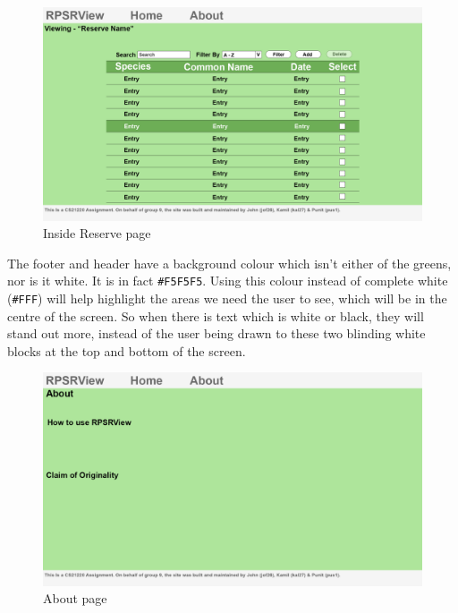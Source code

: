 \documentclass[12pt]{article}
\begin{document}
		\begin{figure}[H]
			\begin{center}
				\includegraphics[scale=0.20]{web-InsideReservePLAN}
			\end{center}
			\caption{Inside Reserve page}
			\label{fig:ireserve-page}
		\end{figure}

		\noindent The footer and header have a background colour which isn’t either of the greens, nor is it white. It is in fact \texttt{\#F5F5F5}. Using this colour instead of complete white (\texttt{\#FFF}) will help highlight the areas we need the user to see, which will be in the centre of the screen. So when there is text which is white or black, they will stand out more, instead of the user being drawn to these two blinding white blocks at the top and bottom of the screen.

		\begin{figure}[H]
			\begin{center}
				\includegraphics[scale=0.20]{web-AboutPLAN}
			\end{center}
			\caption{About page}
			\label{fig:about-page}
		\end{figure}
\end{document}
